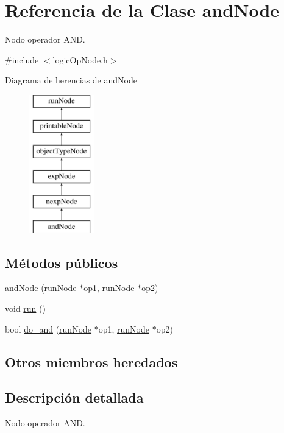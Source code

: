 \hypertarget{classandNode}{\section{Referencia de la Clase and\-Node}
\label{classandNode}
}


Nodo operador A\-N\-D.  




{\ttfamily \#include $<$logic\-Op\-Node.\-h$>$}

Diagrama de herencias de and\-Node\begin{figure}[H]
\begin{center}
\leavevmode
\includegraphics[height=6.000000cm]{classandNode}
\end{center}
\end{figure}
\subsection*{Métodos públicos}
\begin{DoxyCompactItemize}
\item 
\hyperlink{classandNode_acb6e360d4b21f6694813dba082a5670f}{and\-Node} (\hyperlink{classrunNode}{run\-Node} $\ast$op1, \hyperlink{classrunNode}{run\-Node} $\ast$op2)
\item 
void \hyperlink{classandNode_a87b7e06b52e72e4f6d08027d59310a7e}{run} ()
\item 
bool \hyperlink{classandNode_accc774b3bdd4c0a322b58a0947f06635}{do\-\_\-and} (\hyperlink{classrunNode}{run\-Node} $\ast$op1, \hyperlink{classrunNode}{run\-Node} $\ast$op2)
\end{DoxyCompactItemize}
\subsection*{Otros miembros heredados}


\subsection{Descripción detallada}
Nodo operador A\-N\-D. 

